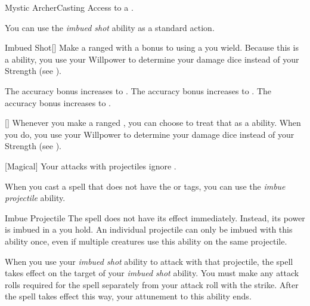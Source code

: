     \begin{feat}{Mystic Archer}{Casting}
        \featpre Access to a .

         You can use the \textit{imbued shot} ability as a standard action.
        \begin{freeability}{Imbued Shot}[]
            Make a ranged  with a  bonus to  using a  you wield.
            Because this is a  ability, you use your Willpower to determine your damage dice instead of your Strength (see ).

            \rankline
             The accuracy bonus increases to .
             The accuracy bonus increases to .
             The accuracy bonus increases to .
        \end{freeability}

        [] Whenever you make a ranged , you can choose to treat that as a  ability.
        When you do, you use your Willpower to determine your damage dice instead of your Strength (see ).

        [Magical] Your attacks with projectiles ignore .

         When you cast a spell that does not have the  or  tags,
            you can use the \textit{imbue projectile} ability.
        \begin{attuneability}{Imbue Projectile}
            \rankline
            The spell does not have its effect immediately.
            Instead, its power is imbued in a  you hold.
            An individual projectile can only be imbued with this ability once, even if multiple creatures use this ability on the same projectile.

            When you use your \textit{imbued shot} ability to attack with that projectile, the spell takes effect on the target of your \textit{imbued shot} ability.
            You must make any attack rolls required for the spell separately from your attack roll with the strike.
            After the spell takes effect this way, your attunement to this ability ends.
        \end{attuneability}


\end{feat}
